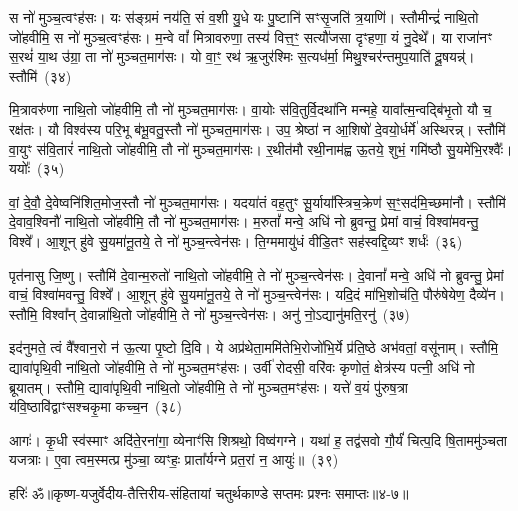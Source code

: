 स नो॑ मुञ्च॒त्वꣳह॑सः। यः स॑ङ्ग्रमं नय॑ति॒ सं व॒शी यु॒धे यः पु॒ष्टानि॑ सꣳसृ॒जति॑ त्र॒याणि॑। स्तौमीन्द्रं॑ नाथि॒तो जो॑हवीमि॒ स नो॑ मुञ्च॒त्वꣳह॑सः। म॒न्वे वां᳚ मित्रावरुणा॒ तस्य॑ वित्त॒ꣳ॒ सत्यौ॑जसा दृꣳहणा॒ यं नु॒देथे᳚। या राजा॑नꣳ स॒रथं॑ या॒थ उ॑ग्रा॒ ता नो॑ मुञ्चत॒माग॑सः। यो वा॒ꣳ॒ रथ॑ ऋ॒जुर॑श्मिः स॒त्यध॑र्मा॒ मिथु॒श्चर॑न्तमुप॒याति॑ दू॒षयन्न्॑। स्तौमि॑~(३४)

मि॒त्रावरु॑णा नाथि॒तो जो॑हवीमि॒ तौ नो॑ मुञ्चत॒माग॑सः। वा॒योः स॑वि॒तुर्वि॒दथा॑नि मन्महे॒ यावा᳚त्म॒न्वद्बि॑भृ॒तो यौ च॒ रक्ष॑तः। यौ विश्व॑स्य परि॒भू ब॑भू॒वतु॒स्तौ नो॑ मुञ्चत॒माग॑सः। उप॒ श्रेष्ठा॑ न आ॒शिषो॑ दे॒वयो॒र्धर्मे॑ अस्थिरन्न्। स्तौमि॑ वा॒युꣳ स॑वि॒तारं॑ नाथि॒तो जो॑हवीमि॒ तौ नो॑ मुञ्चत॒माग॑सः। र॒थीत॑मौ रथी॒नाम॑ह्व ऊ॒तये॒ शुभं॒ गमि॑ष्ठौ सु॒यमे॑भि॒रश्वैः᳚। ययोः᳚~(३५)

वां॒ दे॒वौ॒ दे॒वेष्वनि॑शित॒मोज॒स्तौ नो॑ मुञ्चत॒माग॑सः। यदया॑तं वह॒तुꣳ सू॒र्याया᳚स्त्रिच॒क्रेण॑ स॒ꣳ॒सद॑मि॒च्छमा॑नौ। स्तौमि॑ दे॒वाव॒श्विनौ॑ नाथि॒तो जो॑हवीमि॒ तौ नो॑ मुञ्चत॒माग॑सः। म॒रुतां᳚ मन्वे॒ अधि॑ नो ब्रुवन्तु॒ प्रेमां वाचं॒ विश्वा॑मवन्तु॒ विश्वे᳚। आ॒शून् हु॑वे सु॒यमा॑नू॒तये॒ ते नो॑ मुञ्च॒न्त्वेन॑सः। ति॒ग्ममायु॑धं वीडि॒तꣳ सह॑स्वद्दि॒व्यꣳ शर्धः॑~(३६)

पृत॑नासु जि॒ष्णु। स्तौमि॑ दे॒वान्म॒रुतो॑ नाथि॒तो जो॑हवीमि॒ ते नो॑ मुञ्च॒न्त्वेन॑सः। दे॒वानां᳚ मन्वे॒ अधि॑ नो ब्रुवन्तु॒ प्रेमां वाचं॒ विश्वा॑मवन्तु॒ विश्वे᳚। आ॒शून् हु॑वे सु॒यमा॑नू॒तये॒ ते नो॑ मुञ्च॒न्त्वेन॑सः। यदि॒दं मा॑भि॒शोच॑ति॒ पौरु॑षेयेण॒ दैव्ये॑न। स्तौमि॒ विश्वा᳚न् दे॒वान्ना॑थि॒तो जो॑हवीमि॒ ते नो॑ मुञ्च॒न्त्वेन॑सः। अनु॑ नो॒\-ऽद्यानु॑मति॒रनु॑~(३७)

इद॑नुमते॒ त्वं वै᳚श्वान॒रो न॑ ऊ॒त्या पृ॒ष्टो दि॒वि। ये अप्र॑थेता॒ममि॑तेभि॒रोजो॑भि॒र्ये प्र॑ति॒ष्ठे अभ॑वतां॒ वसू॑नाम्। स्तौमि॒ द्यावा॑\-पृथि॒वी ना॑थि॒तो जो॑हवीमि॒ ते नो॑ मुञ्चत॒मꣳह॑सः। उर्वी॑ रोदसी॒ वरि॑वः कृणोतं॒ क्षेत्र॑स्य पत्नी॒ अधि॑ नो ब्रूयातम्। स्तौमि॒ द्यावा॑\-पृथि॒वी ना॑थि॒तो जो॑हवीमि॒ ते नो॑ मुञ्चत॒मꣳह॑सः। यत्ते॑ व॒यं पु॑रुष॒त्रा य॑वि॒ष्ठावि॑द्वाꣳसश्चकृ॒मा कच्च॒न~(३८)

आगः॑। कृ॒धी स्व॑स्माꣳ अदि॑ते॒रना॑गा॒ व्येनाꣳ॑सि शिश्रथो॒ विष्व॑गग्ने। यथा॑ ह॒ तद्व॑सवो गौ॒र्यं॑ चित्प॒दि षि॒ताममु॑ञ्चता यजत्राः। ए॒वा त्वम॒स्मत्प्र मु॑ञ्चा॒ व्यꣳहः॒ प्राता᳚र्यग्ने प्रत॒रां न॒ आयुः॑॥~(३९)


{\anuvakamend[{गन्ता॑ दू॒षय॒न्थ्स्तौमि॒ ययोः॒ शर्धो\-ऽनु॑मति॒रनु॑ च॒न चतु॑स्त्रिꣳशच्च}]}%

{हरिः॑ ॐ}{॥कृष्ण-यजुर्वेदीय-तैत्तिरीय-संहितायां चतुर्थकाण्डे सप्तमः प्रश्नः समाप्तः॥४-७॥}

